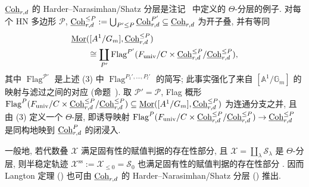 \begin{remark}\label{src:9.3.19}
$\underline{\mathrm{Coh}}_{r,d}$ 的 Harder--Narasimhan/Shatz 分层是注记~ 中定义的 $\Theta$-分层的例子. 对每个 HN 多边形 $\mathcal P$, $\underline{\mathrm{Coh}}_{r,d}^{\leq P}:=\bigcup_{P'\leq P}\underline{\mathrm{Coh}}_{r,d}^{P'}\subseteq\underline{\mathrm{Coh}}_{r,d}$ 为开子叠, 并有等同
\[
\begin{aligned}
&\underline{\operatorname{Mor}}([A^1/G_m],\underline{\mathrm{Coh}}_{r,d}^{\leq P})\\
&\qquad\cong\coprod_{P'}\operatorname{Flag}^{P'}(F_{\mathrm{univ}}/C\times\underline{\mathrm{Coh}}_{r,d}^{\leq P}/\underline{\mathrm{Coh}}_{r,d}^{\leq P}),
\end{aligned}
\]
其中 $\operatorname{Flag}^{\mathcal P'}$ 是上述 (3) 中 $\operatorname{Flag}^{P_1',\ldots,P_l'}$ 的简写; 此事实强化了来自 $[\mathbb A^1/\mathbb G_m]$ 的映射与滤过之间的对应 (命题~). 取 $\mathcal P'=\mathcal P$, Flag 概形 $\operatorname{Flag}^{P}(F_{\mathrm{univ}}/C\times\underline{\mathrm{Coh}}_{r,d}^{\leq P}/\underline{\mathrm{Coh}}_{r,d}^{\leq P})\subseteq\underline{\operatorname{Mor}}([A^1/G_m],\underline{\mathrm{Coh}}_{r,d}^{\leq P})$ 为连通分支之并, 且由 (3) 定义一个 $\Theta$-层, 即诱导映射 $\operatorname{Flag}^{P}(F_{\mathrm{univ}}/C\times\underline{\mathrm{Coh}}_{r,d}^{\leq P}/\underline{\mathrm{Coh}}_{r,d}^{\leq P})\to\underline{\mathrm{Coh}}_{r,d}^{\leq P}$ 是同构地映到 $\underline{\mathrm{Coh}}_{r,d}^{P}$ 的闭浸入.

一般地, 若代数叠 $\mathcal X$ 满足固有性的赋值判据的存在性部分, 且 $\mathcal X=\coprod_\lambda\mathcal S_\lambda$ 是 $\Theta$-分层, 则半稳定轨迹 $\mathcal X^{\mathrm{ss}}:=\mathcal X_{\leq0}=\mathcal S_0$ 也满足固有性的赋值判据的存在性部分 \cite[定理 6.5]{AHLH23}. 因而 Langton 定理 () 也可由 $\underline{\mathrm{Coh}}_{r,d}$ 的 Harder--Narasimhan/Shatz 分层 () 推出.
\end{remark}

